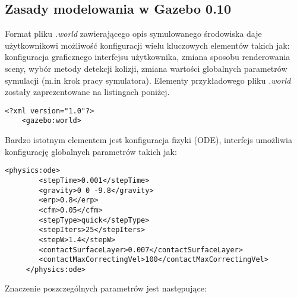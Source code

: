 	\subsection{Zasady modelowania w Gazebo 0.10}
	Format pliku \textit{.world} zawierającego opis symulowanego środowiska daje użytkownikowi możliwość konfiguracji wielu kluczowych elementów takich jak: konfiguracja graficznego interfejsu użytkownika,
	zmiana sposobu renderowania sceny, wybór metody detekcji kolizji, zmiana wartości globalnych parametrów symulacji (m.in krok pracy symulatora). Elementy przykładowego pliku \textit{.world} zostały zaprezentowane na listingach poniżej.
	\begin{lstlisting}[name=gazebo_simple_world]
	<?xml version="1.0"?>
	<gazebo:world>
	\end{lstlisting}
	Bardzo istotnym elementem jest konfiguracja fizyki (ODE), interfejs umożliwia konfigurację globalnych parametrów takich jak:
	\begin{lstlisting}[name=gazebo_simple_world]
	<physics:ode>
		<stepTime>0.001</stepTime>
		<gravity>0 0 -9.8</gravity>		
		<erp>0.8</erp>
		<cfm>0.05</cfm>
		<stepType>quick</stepType>
		<stepIters>25</stepIters>
		<stepW>1.4</stepW>
		<contactSurfaceLayer>0.007</contactSurfaceLayer>
		<contactMaxCorrectingVel>100</contactMaxCorrectingVel>
	 </physics:ode>
	\end{lstlisting}
	Znaczenie poszczególnych parametrów jest następujące:
